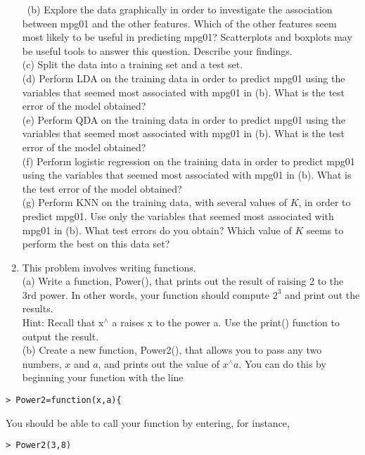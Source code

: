 \documentclass[10pt]{article}
\begin{document}
\begin{enumerate}
\
(b) Explore the data graphically in order to investigate the association between mpg01 and the other features. Which of the other features seem most likely to be useful in predicting mpg01? Scatterplots and boxplots may be useful tools to answer this question. Describe your findings.\\
(c) Split the data into a training set and a test set.\\
(d) Perform LDA on the training data in order to predict mpg01 using the variables that seemed most associated with mpg01 in (b). What is the test error of the model obtained?\\
(e) Perform QDA on the training data in order to predict mpg01 using the variables that seemed most associated with mpg01 in (b). What is the test error of the model obtained?\\
(f) Perform logistic regression on the training data in order to predict mpg01 using the variables that seemed most associated with mpg01 in (b). What is the test error of the model obtained?\\
(g) Perform KNN on the training data, with several values of $K$, in order to predict mpg01. Use only the variables that seemed most associated with mpg01 in (b). What test errors do you obtain? Which value of $K$ seems to perform the best on this data set?
  \item This problem involves writing functions.\\
(a) Write a function, Power(), that prints out the result of raising 2 to the 3rd power. In other words, your function should compute $2^{3}$ and print out the results.\\
Hint: Recall that $\mathrm{x}^{\wedge}$ a raises x to the power a. Use the print() function to output the result.\\
(b) Create a new function, Power2(), that allows you to pass any two numbers, $x$ and $a$, and prints out the value of $x^{\wedge} a$. You can do this by beginning your function with the line
\end{enumerate}

\begin{verbatim}
> Power2=function(x,a){
\end{verbatim}

You should be able to call your function by entering, for instance,

\begin{verbatim}
> Power2(3,8)
\end{verbatim}
\end{document}
